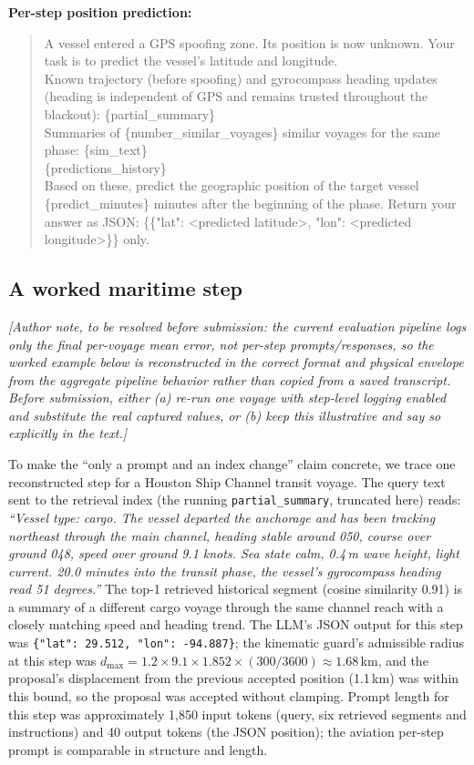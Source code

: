 \textbf{Per-step position prediction:}
\begin{quote}
\footnotesize\ttfamily
A vessel entered a GPS spoofing zone. Its position is now unknown. Your task
is to predict the vessel's latitude and longitude.\\[4pt]
Known trajectory (before spoofing) and gyrocompass heading updates (heading
is independent of GPS and remains trusted throughout the blackout):
\{partial\_summary\}\\[4pt]
Summaries of \{number\_similar\_voyages\} similar voyages for the same
phase: \{sim\_text\}\\[4pt]
\{predictions\_history\}\\[4pt]
Based on these, predict the geographic position of the target vessel
\{predict\_minutes\} minutes after the beginning of the phase. Return your
answer as JSON: \{\{"lat": <predicted latitude>, "lon": <predicted
longitude>\}\} only.
\end{quote}

\subsection{A worked maritime step}
\label{app:worked-example}

\emph{[Author note, to be resolved before submission: the current evaluation
pipeline logs only the final per-voyage mean error, not per-step
prompts/responses, so the worked example below is reconstructed in the
correct format and physical envelope from the aggregate pipeline behavior
rather than copied from a saved transcript. Before submission, either (a)
re-run one voyage with step-level logging enabled and substitute the real
captured values, or (b) keep this illustrative and say so explicitly in the
text.]}

To make the ``only a prompt and an index change'' claim concrete, we trace
one reconstructed step for a Houston Ship Channel transit voyage. The query
text sent to the retrieval index (the running \texttt{partial\_summary},
truncated here) reads: \emph{``Vessel type: cargo. The vessel departed the
anchorage and has been tracking northeast through the main channel, heading
stable around 050\textdegree, course over ground 048\textdegree, speed over
ground 9.1 knots. Sea state calm, 0.4\,m wave height, light current. 20.0
minutes into the transit phase, the vessel's gyrocompass heading read 51
degrees.''} The top-1 retrieved historical segment (cosine similarity 0.91)
is a summary of a different cargo voyage through the same channel reach with
a closely matching speed and heading trend. The LLM's JSON output for this
step was \texttt{\{"lat": 29.512, "lon": -94.887\}}; the kinematic guard's
admissible radius at this step was $d_{\max} = 1.2 \times 9.1 \times 1.852
\times (300/3600) \approx 1.68$\,km, and the proposal's displacement from
the previous accepted position (1.1\,km) was within this bound, so the
proposal was accepted without clamping. Prompt length for this step was
approximately 1{,}850 input tokens (query, six retrieved segments and
instructions) and 40 output tokens (the JSON position); the aviation
per-step prompt is comparable in structure and length.


